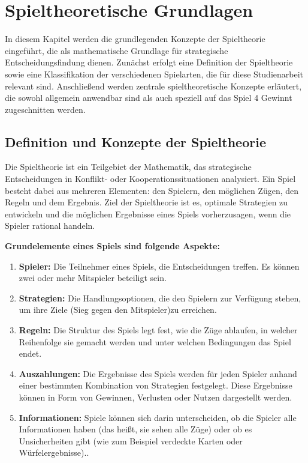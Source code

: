 \chapter{Spieltheoretische Grundlagen}
In diesem Kapitel werden die grundlegenden Konzepte der Spieltheorie eingeführt, die als mathematische Grundlage für strategische Entscheidungsfindung dienen. Zunächst erfolgt eine Definition der Spieltheorie sowie eine Klassifikation der verschiedenen Spielarten, die für diese Studienarbeit relevant sind. Anschließend werden zentrale spieltheoretische Konzepte erläutert, die sowohl allgemein anwendbar sind als auch speziell auf das Spiel 4 Gewinnt zugeschnitten werden.

\section{Definition und Konzepte der Spieltheorie}
Die Spieltheorie ist ein Teilgebiet der Mathematik, das strategische Entscheidungen in Konflikt- oder Kooperationssituationen analysiert. Ein Spiel besteht dabei aus mehreren Elementen: den Spielern, den möglichen Zügen, den Regeln und dem Ergebnis. Ziel der Spieltheorie ist es, optimale Strategien zu entwickeln und die möglichen Ergebnisse eines Spiels vorherzusagen, wenn die Spieler rational handeln.

\textbf{Grundelemente eines Spiels sind folgende Aspekte:}

\begin{enumerate}
	\item \textbf{Spieler:} Die Teilnehmer eines Spiels, die Entscheidungen treffen. Es können zwei oder mehr Mitspieler beteiligt sein.
	\item \textbf{Strategien:} Die Handlungsoptionen, die den Spielern zur Verfügung stehen, um ihre Ziele (Sieg gegen den Mitspieler)zu erreichen.
	\item \textbf{Regeln:} Die Struktur des Spiels legt fest, wie die Züge ablaufen, in welcher Reihenfolge sie gemacht werden und unter welchen Bedingungen das Spiel endet.
	\item \textbf{Auszahlungen:} Die Ergebnisse des Spiels werden für jeden Spieler anhand einer bestimmten Kombination von Strategien festgelegt. Diese Ergebnisse können in Form von Gewinnen, Verlusten oder Nutzen dargestellt werden.
	\item \textbf{Informationen:} Spiele können sich darin unterscheiden, ob die Spieler alle Informationen haben (das heißt, sie sehen alle Züge) oder ob es Unsicherheiten gibt (wie zum Beispiel verdeckte Karten oder Würfelergebnisse).\autocite{holler_einfuhrung_2019}.
\end{enumerate}

